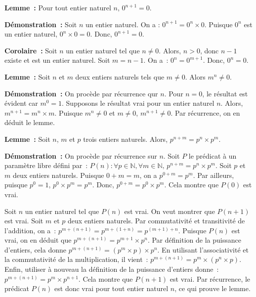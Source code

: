    \done 

\medskip

\noindent\textbf{Lemme :} Pour tout entier naturel $n$, $0^{n+1} = 0$. 

\medskip

\noindent\textbf{Démonstration :} Soit $n$ un entier naturel. 
    On a : $0^{n+1} = 0^n \times 0$. 
    Puisque $0^n$ est un entier naturel, $0^n \times 0 = 0$. 
    Donc, $0^{n+1} = 0$.

   \done 
\medskip

\noindent\textbf{Corolaire :} 
    Soit $n$ un entier naturel tel que $n \neq 0$. 
    Alors, $n > 0$, donc $n - 1$ existe et est un entier naturel.
    Soit $m = n - 1$. 
    On a : $0^n = 0^{m + 1}$. 
    Donc, $0^n = 0$.

\medskip

\noindent\textbf{Lemme :} Soit $n$ et $m$ deux entiers naturels tels que $m \neq 0$. 
    Alors $m^n \neq 0$.

\medskip

\noindent\textbf{Démonstration :} On procède par récurrence qur $n$. 
    Pour $n = 0$, le résultat est évident car $m^0 = 1$. 
    Supposons le résultat vrai pour un entier naturel $n$. 
    Alors, $m^{n+1} = m^n \times m$. 
    Puisque $m^n \neq 0$ et $m \neq 0$, $m^{n+1} \neq 0$. 
    Par récurrence, on en déduit le lemme.

   \done 

\medskip

\noindent\textbf{Lemme :} Soit $n$, $m$ et $p$ trois entiers naturels. 
    Alors, $p^{n+m} = p^n \times p^m$.

\medskip

\noindent\textbf{Démonstration :} On procède par récurrence sur $n$. 
    Soit $P$ le prédicat à un paramètre libre défini par : $P(n): \forall p \in \mathbb{N}, \forall m \in \mathbb{N}, \, p^{n+m} = p^n \times p^m$. 
    Soit $p$ et $m$ deux entiers naturels. 
    Puisque $0 + m = m$, on a $p^{0 + m} = p^m$. 
    Par ailleurs, puisque $p^0 = 1$, $p^0 \times p^m = p^m$. 
    Donc, $p^{0+m} = p^0 \times p^m$. 
    Cela montre que $P(0)$ est vrai. 

    Soit $n$ un entier naturel tel que $P(n)$ est vrai. 
    On veut montrer que $P(n+1)$ est vrai. 
    Soit $m$ et $p$ deux entiers naturels. 
    Par commutativité et transitivité de l'addition, on a : $p^{m+(n+1)} = p^{m+(1+n)} = p^{(m+1)+n}$. 
    Puisque $P(n)$ est vrai, on en déduit que $p^{m+(n+1)} = p^{m+1} \times p^n$. 
    Par définition de la puissance d'entiers, cela donne $p^{m+(n+1)} = (p^m \times p) \times p^n$. 
    En utilisant l'associativité et la commutativité de la multiplication, il vient : $p^{m+(n+1)} = p^m \times (p^n \times p)$. 
    Enfin, utiliser à nouveau la définition de la puissance d'entiers donne : $p^{m+(n+1)} = p^m \times p^{n+1}$. 
    Cela montre que $P(n+1)$ est vrai. 
    Par récurrence, le prédicat $P(n)$ est donc vrai pour tout entier naturel $n$, ce qui prouve le lemme. 

